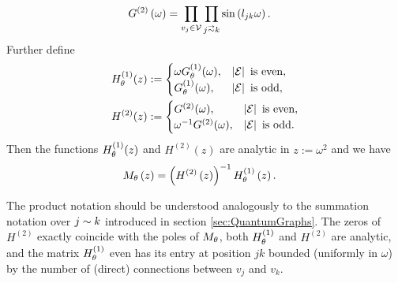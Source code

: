 \begin{cory}
\begin{align*}
		G^{(2)}\bracs{\omega} &= \prod_{v_j\in\vertSet} \prod_{j\conLeft k}\sin\bracs{l_{jk}\omega}.
	\end{align*}
	Further define
	\begin{align*}
		H^{(1)}_{\theta}(z) &:= 
		\begin{cases} 
			\omega G_\theta^{(1)}(\omega), & \left\lvert \mathcal{E} \right\rvert \text{ is even}, \\
			G_\theta^{(1)}(\omega), & \left\lvert \mathcal{E} \right\rvert \text{ is odd},
		\end{cases} \\
		H^{(2)}(z) &:=
		\begin{cases}
			G^{(2)}(\omega), & \left\lvert \mathcal{E} \right\rvert \text{ is even}, \\
			\omega^{-1} G^{(2)}(\omega), & \left\lvert \mathcal{E} \right\rvert \text{ is odd}.
		\end{cases}
	\end{align*}
	Then the functions $H^{(1)}_{\theta}(z)$ and $H^{(2)}(z)$ are analytic in $z:=\omega^2$ and we have
	\begin{align*}
		M_\theta\left( z \right) &= \left(  H^{(2)}\left( z \right)  \right)^{-1} H^{(1)}_\theta\left( z \right).
	\end{align*}
\end{cory}
The product notation should be understood analogously to the summation notation over $j\sim k$ introduced in section \ref{sec:QuantumGraphs}.
The zeros of $H^{(2)}$ exactly coincide with the poles of $M_\theta$, both $H^{(1)}_\theta$ and $H^{(2)}$ are analytic, and the matrix $H^{(1)}_\theta$ even has its entry at position $jk$ bounded (uniformly in $\omega$) by the number of (direct) connections between $v_j$ and $v_k$.

